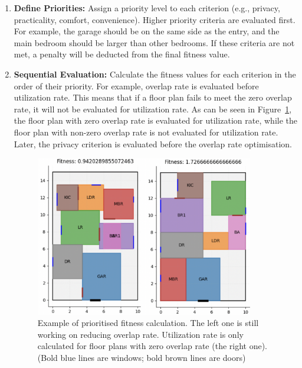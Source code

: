 \documentclass[]{article}
\begin{document}
\begin{enumerate}
    \item \textbf{Define Priorities:} Assign a priority level to each criterion (e.g., privacy, practicality, comfort, convenience). Higher priority criteria are evaluated first. For example, the garage should be on the same side as the entry, and the main bedroom should be larger than other bedrooms. If these criteria are not met, a penalty will be deducted from the final fitness value.
    \item \textbf{Sequential Evaluation:} Calculate the fitness values for each criterion in the order of their priority. For example, overlap rate is evaluated before utilization rate. This means that if a floor plan fails to meet the zero overlap rate, it will not be evaluated for utilization rate. As can be seen in Figure~\ref{fig:prioritized-fitness}, the floor plan with zero overlap rate is evaluated for utilization rate, while the floor plan with non-zero overlap rate is not evaluated for utilization rate. Later, the privacy criterion is evaluated before the overlap rate optimisation.
          \begin{figure}[h]
              \centering
              \includegraphics[width=0.9\textwidth]{images/prioritized-fitness.png}
              \caption{Example of prioritised fitness calculation. The left one is still working on reducing overlap rate. Utilization rate is only calculated for floor plans with zero overlap rate (the right one). (Bold blue lines are windows; bold brown lines are doors)}
              \label{fig:prioritized-fitness}
          \end{figure}


\end{enumerate}
\end{document}
